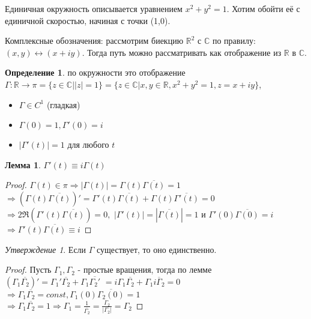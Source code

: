 \documentclass[a4paper]{article}
\theoremstyle{indented}
\newtheorem{lemma}{Лемма}
\theoremstyle{definition}
\newtheorem{defn}{Определение}
\theoremstyle{remark}
\newtheorem{stat}{Утверждение}
\begin{document}
Единичная окружность описывается уравнением $x^2+y^2=1$.
Хотим обойти её с единичной скоростью, начиная с точки (1,0).

Комплексные обозначения: рассмотрим биекцию $\mathbb{R}^2$ с $\mathbb{C}$ по правилу:
$(x,y) \leftrightarrow (x+iy)$. Тогда путь можно рассматривать как отображение из $\mathbb{R}$ в $\mathbb{C}$.

\begin{defn}
    по окружности это отображение \\
    $\Gamma: \mathbb{R} \to \pi=\{ z\in \mathbb{C} \big| |z| = 1 \} = \{ z\in \mathbb{C} \big| x,y\in \mathbb{R}, x^2+y^2=1, z=x+iy \}$,
    \begin{itemize}
        \item $\Gamma \in C^1$ (гладкая)
        \item $\Gamma(0)=1, \Gamma'(0)=i$
        \item $|\Gamma'(t)|=1$ для любого $t$
    \end{itemize}
\end{defn}

\begin{lemma}
    $\Gamma'(t)\equiv i\Gamma(t)$
\end{lemma}

\begin{proof}
    $\Gamma(t)\in\pi \Rightarrow |\Gamma(t)|=\Gamma(t)\overline{\Gamma(t)} = 1$\\
    $\Rightarrow (\Gamma(t)\overline{\Gamma(t)})' = \Gamma'(t)\overline{\Gamma(t)}+\Gamma(t)\overline{\Gamma'(t)} = 0$\\
    $\Rightarrow 2\Re(\Gamma'(t)\overline{\Gamma(t)})= 0,$
    $|\Gamma'(t)|=|\overline{\Gamma(t)}|=1$ и $\Gamma'(0)\overline{\Gamma(0)}=i$
    $\Rightarrow \Gamma'(t)\overline{\Gamma(t)} \equiv i$
\end{proof}

\begin{stat}
    Если $\Gamma$ существует, то оно единственно.
\end{stat}

\begin{proof}
    Пусть $\Gamma_1, \Gamma_2$ - простые вращения, тогда по лемме\\
    $(\Gamma_1 \overline{\Gamma_2})'=\Gamma_1' \overline{\Gamma_2}+\Gamma_1 \overline{\Gamma_2'}$
    $= i \Gamma_1 \overline{\Gamma_2} + \Gamma_1 \overline{i\Gamma_2} = 0$
    $\Rightarrow \Gamma_1 \overline{\Gamma_2} = const, \Gamma_1(0) \overline{\Gamma_2(0)}=1$\\
    $\displaystyle \Rightarrow \Gamma_1 \overline{\Gamma_2} = 1 \Rightarrow \Gamma_1 = \frac{1}{\overline{\Gamma_2}} = \frac{\Gamma_2}{|\Gamma_2|} = \Gamma_2$
\end{proof}
\end{document}
